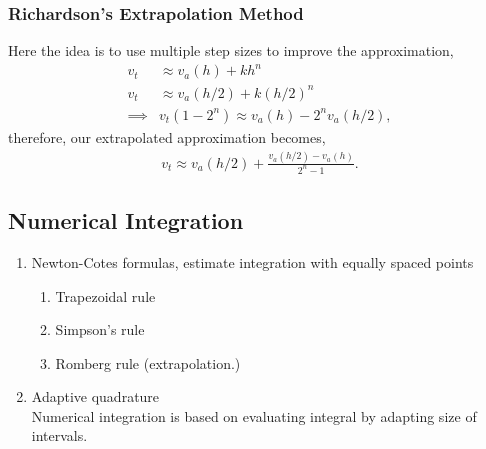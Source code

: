 \documentclass[11pt,a4paper]{report}
\begin{document}
			\subsubsection{Richardson's Extrapolation Method}
				Here the idea is to use multiple step sizes to improve the approximation,
				\begin{align}
					v_t&\approx v_a(h) + kh^n \\
					v_t&\approx v_a(h/2) + k (h/2)^n \\
					\implies &v_t(1-2^n) \approx v_a(h)-2^n v_a(h/2),
				\end{align}
				therefore, our extrapolated approximation becomes,
				\begin{align}
					v_t \approx v_a(h/2) + \frac{v_a (h/2) - v_a(h)}{2^n-1}.
				\end{align}
		\subsection{Numerical Integration}
		\begin{enumerate}
			\item Newton-Cotes formulas, estimate integration with equally spaced points
			\begin{enumerate}
				\item Trapezoidal rule
				\item Simpson's rule
				\item Romberg rule (extrapolation.)
			\end{enumerate}
			\item Adaptive quadrature \\
			Numerical integration is based on evaluating integral by adapting size of intervals. 
		\end{enumerate}
\end{document}
